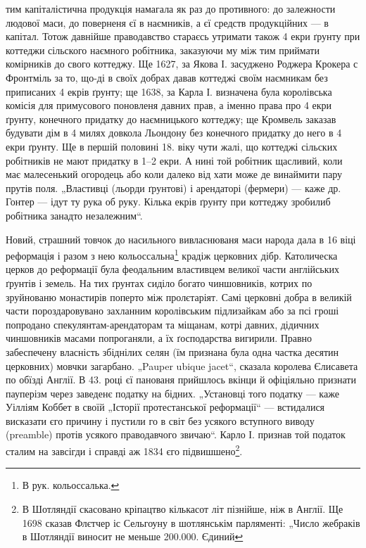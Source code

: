 \parcont{}
тим капіталістична продукція намагала як раз до противного: до залежности людової маси, до поверненя
єї в наємників, а єї средств продукційних — в капітал. Тотож давнійше праводавство стараєсь утримати
також 4 екри ґрунту при коттеджи сільского наємного робітника, заказуючи му між тим приймати
комірників до свого коттеджу. Ще 1627, за Якова І. засуджено Роджера Крокера с Фронтміль за то,
що-ді в своїх добрах давав коттеджі своїм наємникам без приписаних 4 екрів ґрунту; ще 1638, за Карла
І. визначена була королівська комісія для примусового поновленя давних прав, а іменно права про 4
екри ґрунту, конечного придатку до наємницького коттеджу; ще Кромвель заказав будувати дім в 4 милях
довкола Льондону без конечного придатку до него в 4 екри ґрунту. Ще в першій половині 18. віку чути
жалі, що коттеджі сільских робітників не мают придатку в 1--2 екри. А нині той робітник щасливий,
коли має малесенький огородець або коли далеко від хати може де винаймити пару прутів поля.
„Властивці (льорди ґрунтові) і арендаторі (фермери) — каже др. Гонтер — ідут ту рука об руку. Кілька
екрів ґрунту при коттеджу зробилиб робітника занадто незалежним“.

Новий, страшний товчок до насильного вивласнюваня маси народа дала в 16 віці реформація і разом з
нею кольоссальна\footnote*{
В рук. кольоссалька.
} крадіж церковних дібр. Католическа церков до реформації була феодальним
властивцем великої части англійських ґрунтів і земель. На тих ґрунтах сиділо богато чиншовників,
котрих по зруйнованю монастирів поперто між пролєтаріят. Самі церковні добра в великій части
пороздаровувано захланним королівським підлизайкам або за псі гроші попродано
спекулянтам-арендаторам та міщанам, котрі давних, дідичних чиншовників масами попроганяли, а їх
ґосподарства вигирили. Правно забеспечену власність збіднілих селян (їм признана була одна частка
десятин церковних) мовчки загарбано. „Pauper ubique jacet“, сказала королева Єлисавета по обїзді
Англії. В 43. році єї панованя прийшлось вкінци й офіціяльно признати пауперізм через заведенє
податку на бідних. „Установці того податку
— каже Уілліям Коббет в своїй „Історії протестанської реформації“ — встидалися висказати єго причину
і пустили го в світ без усякого вступного виводу (preamble) протів усякого праводавчого звичаю“.
Карло І. признав той податок сталим на завсігди і справді аж 1834 єго підвишшено\footnote{
В Шотляндії скасовано кріпацтво кількасот літ пізнійше, ніж в Англії. Ще 1698 сказав Флєтчер іс
Сельгоуну в шотлянськім парляменті: „Число жебраків в Шотляндії виносит не меньше 200.000. Єдиний
}.
